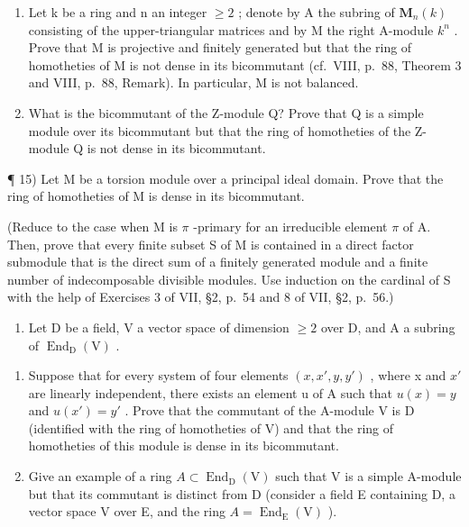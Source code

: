 \begin{enumerate}
\def\labelenumi{\arabic{enumi})}
\setcounter{enumi}{12}
\item
  Let k be a ring and n an integer \(\geqslant 2\) ; denote by A the subring of \(\mathbf{M}_{n}(k)\) consisting of the upper-triangular matrices and by M the right A-module \(k^{n}\) . Prove that M is projective and finitely generated but that the ring of homotheties of M is not dense in its bicommutant (cf.~VIII, p.~88, Theorem 3 and VIII, p.~88, Remark). In particular, M is not balanced.
\item
  What is the bicommutant of the Z-module Q? Prove that Q is a simple module over its bicommutant but that the ring of homotheties of the Z-module Q is not dense in its bicommutant.
\end{enumerate}

¶ 15) Let M be a torsion module over a principal ideal domain. Prove that the ring of homotheties of M is dense in its bicommutant.

(Reduce to the case when M is \(\pi\) -primary for an irreducible element \(\pi\) of A. Then, prove that every finite subset S of M is contained in a direct factor submodule that is the direct sum of a finitely generated module and a finite number of indecomposable divisible modules. Use induction on the cardinal of S with the help of Exercises 3 of VII, §2, p.~54 and 8 of VII, §2, p.~56.)

\begin{enumerate}
\def\labelenumi{\arabic{enumi})}
\setcounter{enumi}{15}
\tightlist
\item
  Let D be a field, V a vector space of dimension \(\geqslant 2\) over D, and A a subring of \(\operatorname{End}_{\mathrm{D}}(\mathrm{V})\) .
\end{enumerate}

\begin{enumerate}
\def\labelenumi{\alph{enumi})}
\item
  Suppose that for every system of four elements \((x, x', y, y')\) , where x and \(x'\) are linearly independent, there exists an element u of A such that \(u(x) = y\) and \(u(x') = y'\) . Prove that the commutant of the A-module V is D (identified with the ring of homotheties of V) and that the ring of homotheties of this module is dense in its bicommutant.
\item
  Give an example of a ring \(A \subset \operatorname{End}_{\mathrm{D}}(\mathrm{V})\) such that V is a simple A-module but that its commutant is distinct from D (consider a field E containing D, a vector space V over E, and the ring \(A = \operatorname{End}_{\mathrm{E}}(\mathrm{V})\) ).
\end{enumerate}

